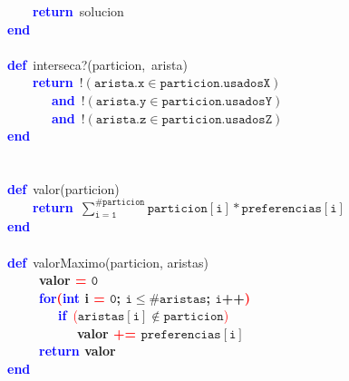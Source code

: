 \mbox{}\ \ \ \ \textbf{\textcolor{Blue}{return}}\ solucion \\
\mbox{}\textbf{\textcolor{Blue}{end}} \\
\mbox{} \\
\mbox{}\textbf{\textcolor{Blue}{def}}\ interseca?\textcolor{BrickRed}{(}particion\textcolor{BrickRed}{,}\ arista\textcolor{BrickRed}{)} \\
\mbox{}\ \ \ \ \textbf{\textcolor{Blue}{return}}\ $\mathtt{!(arista.x \in particion.usadosX)}$ \\
\mbox{}\ \ \ \ \ \ \ \textbf{\textcolor{Blue}{and}}\ $\mathtt{!(arista.y \in particion.usadosY)}$ \\
\mbox{}\ \ \ \ \ \ \ \textbf{\textcolor{Blue}{and}}\ $\mathtt{!(arista.z \in particion.usadosZ)}$ \\
\mbox{}\textbf{\textcolor{Blue}{end}} \\
\mbox{} \\
\mbox{} \\
\mbox{}\textbf{\textcolor{Blue}{def}}\ valor\textcolor{BrickRed}{(}particion\textcolor{BrickRed}{)} \\
\mbox{}\ \ \ \ \textbf{\textcolor{Blue}{return}}\ $\sum_{\mathtt{i=1}}^{\mathtt{\#particion}} \mathtt{particion[i]} * \mathtt{preferencias[i]} $ \\
\mbox{}\textbf{\textcolor{Blue}{end}} \\
\mbox{} \\
\mbox{}\textbf{\textcolor{Blue}{def}}\ valorMaximo\textcolor{BrickRed}{(}particion\textcolor{BrickRed}{,} aristas\textcolor{BrickRed}{)} \\
\mbox{}\ \ \ \ \ \textbf{valor \textcolor{Red}{=} $\mathtt{0}$}\\
\mbox{}\ \ \ \ \ \textbf{\textcolor{Blue}{for}\textcolor{Red}{(}\textcolor{Blue}{int} i \textcolor{Red}{=} $\mathtt{0}$; 
$\mathtt{i \le \#aristas}$; $\mathtt{i}$++\textcolor{Red}{)}}\\
\mbox{}\ \ \ \ \ \ \ \ \textbf{\textcolor{Blue}{if}}\ \textcolor{Red}{(}$\mathtt{aristas[i] \notin particion}$\textcolor{Red}{)} \\
\mbox{}\ \ \ \ \ \ \ \ \ \ \ \textbf{valor \textcolor{Red}{+=} $\mathtt{preferencias[i]}$}\\
\mbox{}\ \ \ \ \ \textbf{\textcolor{Blue}{return} valor}\\
\mbox{}\textbf{\textcolor{Blue}{end}} \\
\mbox{}

